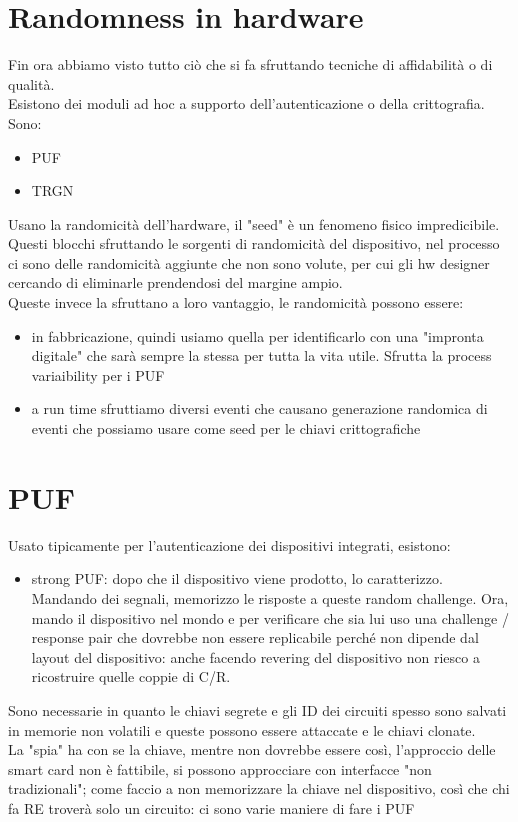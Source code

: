 \documentclass[oneside, 12pt]{extbook}
\begin{document}
\section{Randomness in hardware}
Fin ora abbiamo visto tutto ciò che si fa sfruttando tecniche di affidabilità o di qualità.
\\Esistono dei moduli ad hoc a supporto dell'autenticazione o della crittografia. Sono:
\begin{itemize}
	\item PUF
	\item TRGN
\end{itemize}
Usano la randomicità dell'hardware, il "seed" è un fenomeno fisico impredicibile.
\\Questi blocchi sfruttando le sorgenti di randomicità del dispositivo, nel processo ci sono delle randomicità aggiunte che non sono volute, per cui gli hw designer cercando di eliminarle prendendosi del margine ampio.
\\Queste invece la sfruttano a loro vantaggio, le randomicità possono essere:
\begin{itemize}
	\item in fabbricazione, quindi usiamo quella per identificarlo con una "impronta digitale" che sarà sempre la stessa per tutta la vita utile. Sfrutta la process variaibility per i PUF
	\item a run time sfruttiamo diversi eventi che causano generazione randomica di eventi che possiamo usare come seed per le chiavi crittografiche
\end{itemize}

\section{PUF}
Usato tipicamente per l'autenticazione dei dispositivi integrati, esistono:
\begin{itemize}
	\item strong PUF: dopo che il dispositivo viene prodotto, lo caratterizzo. Mandando dei segnali, memorizzo le risposte a queste random challenge. Ora, mando il dispositivo nel mondo e per verificare che sia lui uso una challenge / response pair che dovrebbe non essere replicabile perché non dipende dal layout del dispositivo: anche facendo revering del dispositivo non riesco a ricostruire quelle coppie di C/R.
\end{itemize}
Sono necessarie in quanto le chiavi segrete e gli ID dei circuiti spesso sono salvati in memorie non volatili e queste possono essere attaccate e le chiavi clonate.
\\La "spia" ha con se la chiave, mentre non dovrebbe essere così, l'approccio delle smart card non è fattibile, si possono approcciare con interfacce "non tradizionali";
come faccio a non memorizzare la chiave nel dispositivo, così che chi fa RE troverà solo un circuito: ci sono varie maniere di fare i PUF
\end{document}
